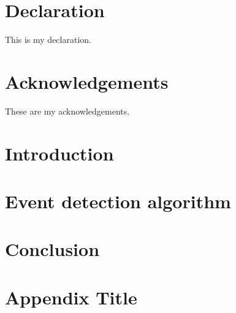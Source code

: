 \documentclass[12pt,twoside]{report}
\begin{document}






\chapter*{Declaration}
This is my declaration.


\chapter*{Acknowledgements}
These are my acknowledgements.


\tableofcontents
\listoffigures
\listofalgorithms


\chapter*{Introduction}


\chapter{Event detection algorithm}


\chapter*{Conclusion}



\appendix
\chapter{Appendix Title}



\printbibliography
\end{document}
